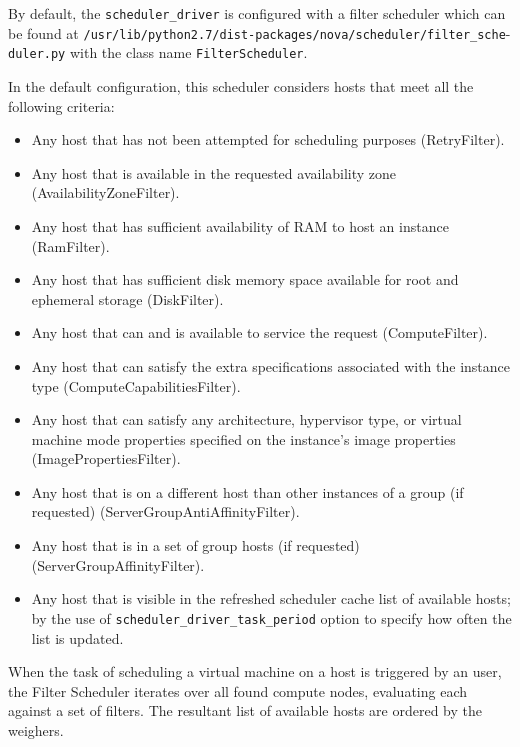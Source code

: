 By default, the \verb|scheduler_driver| is configured with a filter scheduler which can be found at \verb|/usr/lib/python2.7/dist-packages/nova/scheduler/filter_sche|- \verb|duler.py| with the class name \verb|FilterScheduler|.

In the default configuration, this scheduler considers hosts that meet all the following criteria:

\begin{itemize}
	\item Any host that has not been attempted for scheduling purposes (RetryFilter).

	\item Any host that is available in the requested availability zone (AvailabilityZoneFilter).

	\item Any host that has sufficient availability of RAM to host an instance (RamFilter).

	\item Any host that has sufficient disk memory space available for root and ephemeral storage (DiskFilter).

	\item Any host that can and is available to service the request (ComputeFilter).

	\item Any host that can satisfy the extra specifications associated with the instance type (ComputeCapabilitiesFilter).

	\item Any host that can satisfy any architecture, hypervisor type, or virtual machine mode properties specified on the instance's image properties (ImagePropertiesFilter).

	\item Any host that is on a different host than other instances of a group (if requested) (ServerGroupAntiAffinityFilter).

	\item Any host that is in a set of group hosts (if requested) (ServerGroupAffinityFilter).

	\item Any host that is visible in the refreshed scheduler cache list of available hosts; by the use of \verb|scheduler_driver_task_period| option to specify how often the list is updated.
\end{itemize}

When the task of scheduling a virtual machine on a host is triggered by an user, the Filter Scheduler iterates over all found compute nodes, evaluating each against a set of filters.
The resultant list of available hosts are ordered by the weighers.

